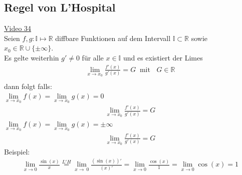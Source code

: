 \subsection{Regel von L’Hospital}
\href{https://youtu.be/wBqlghVLs04}{Video 34}\\
Seien $ f,g: \mathbb{I} \longmapsto \mathbb{R}$ diffbare Funktionen auf dem Intervall $\mathbb{I}\subset \mathbb{R}$ sowie $ x_0\in \mathbb{R}\cup \{\pm\infty\} $.\\
Es gelte weiterhin $ g'\neq 0 $ für alle $ x\in\mathbb{I}$ und es existiert der Limes\\
\begin{align*}
\lim\limits_ {x\to x_0} \frac{f'(x)}{g'(x)}=G\;\;\text{mit }\;\;  G\in \mathbb{R}\\
\end{align*}
dann folgt falls:\\
\textbullet \;\; $ \lim\limits_ {x\to x_0}f(x)= \lim\limits_ {x\to x_0}g(x)= 0 $\\
\begin{align*}
\lim\limits_ {x\to x_0} \frac{f'(x)}{g'(x)}=G
\end{align*}
\textbullet \;\; $ \lim\limits_ {x\to x_0}f(x)= \lim\limits_ {x\to x_0}g(x)= \pm\infty $\\
\begin{align*}
\lim\limits_ {x\to x_0} \frac{f'(x)}{g'(x)}=G
\end{align*}
Beispiel:\\
\begin{align*}
\lim\limits_ {x\to 0}\frac{\sin(x)}{x}\overset{L'H}{=}\lim\limits_ {x\to\ 0}\frac{(\sin(x))'}{(x)'}=\lim\limits_ {x\to 0} \frac{\cos(x)}{1}=\lim\limits_ {x\to 0} \cos(x)=1\\
\end{align*}
